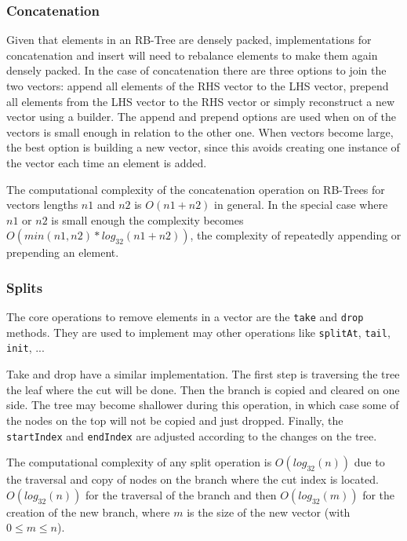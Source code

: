 \subsubsection{Concatenation}
Given that elements in an RB-Tree are densely packed, implementations for concatenation and insert will need to rebalance elements to make them again densely packed. In the case of concatenation there are three options to join the two vectors: append all elements of the RHS vector to the LHS vector, prepend all elements from the LHS vector to the RHS vector or simply reconstruct a new vector using a builder. The append and prepend options are used when on of the vectors is small enough in relation to the other one. When vectors become large, the best option is building a new vector, since this avoids creating one instance of the vector each time an element is added.

The computational complexity of the concatenation operation on RB-Trees for vectors lengths $n1$ and $n2$ is $O(n1 + n2)$ in general. In the special case where $n1$ or $n2$ is small enough the complexity becomes $O(min(n1,n2)*log_{32}(n1+n2))$, the complexity of repeatedly appending or prepending an element.

\subsubsection{Splits}
The core operations to remove elements in a vector are the \texttt{take} and \texttt{drop} methods. They are used to implement may other operations like \texttt{splitAt}, \texttt{tail}, \texttt{init}, ...

Take and drop have a similar implementation. The first step is traversing the tree the leaf where the cut will be done. Then the branch is copied and cleared on one side. The tree may become shallower during this operation, in which case some of the nodes on the top will not be copied and just dropped. Finally, the \texttt{startIndex} and \texttt{endIndex} are adjusted according to the changes on the tree.

The computational complexity of any split operation is $O(log_{32}(n))$ due to the traversal and copy of nodes on the branch where the cut index is located. $O(log_{32}(n))$ for the traversal of the branch and then $O(log_{32}(m))$ for the creation of the new branch, where $m$ is the size of the new vector (with $0\leq m \leq n$).


